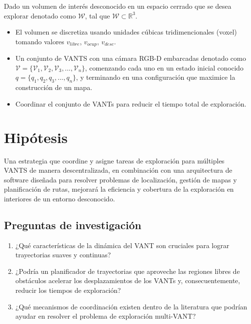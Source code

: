 Dado un volumen de interés desconocido en un espacio cerrado que se desea explorar denotado como $\mathcal{W}$, tal que $\mathcal{W} \subset \mathbb{R}^{3}$.
\begin{itemize}\setlength{\itemsep}{-1mm}
  \item El volumen se discretiza usando unidades cúbicas tridimencionales (voxel) tomando valores $v_{libre}$, $v_{ocup}$, $v_{desc}$.
  \item Un conjunto de VANTS con una cámara RGB-D embarcadas denotado como $\mathcal{V} = \{\mathcal{V}_{1},\mathcal{V}_{2},\mathcal{V}_{3},...,\mathcal{V}_{n}\}$, comenzando cada uno en un estado inicial conocido $q = \{q_{1},q_{2},q_{3},...,q_{n}\}$, y terminando en una configuración que maximice la construcción de un mapa.
  \item Coordinar el conjunto de VANTs para reducir el tiempo total de exploración.
  \end{itemize}

  
  
\section{Hipótesis}

Una estrategia que coordine y asigne tareas de exploración para múltiples VANTS de manera descentralizada, en combinación con una arquitectura de software diseñada para resolver problemas de localización, gestión de mapas y planificación de rutas, mejorará la eficiencia y cobertura de la exploración en interiores de un entorno desconocido.

\subsection{Preguntas de investigación}

\begin{enumerate}\setlength{\itemsep}{-1mm}
\item ¿Qué características de la dinámica del VANT son cruciales para lograr trayectorias suaves y continuas?
\item ¿Podría un planificador de trayectorias que aproveche las regiones libres de obstáculos acelerar los desplazamientos de los VANTs y, consecuentemente, reducir los tiempos de exploración?
\item ¿Qué mecanismos de coordinación existen dentro de la literatura que podrían ayudar en resolver el problema de exploración multi-VANT?
\end{enumerate}

